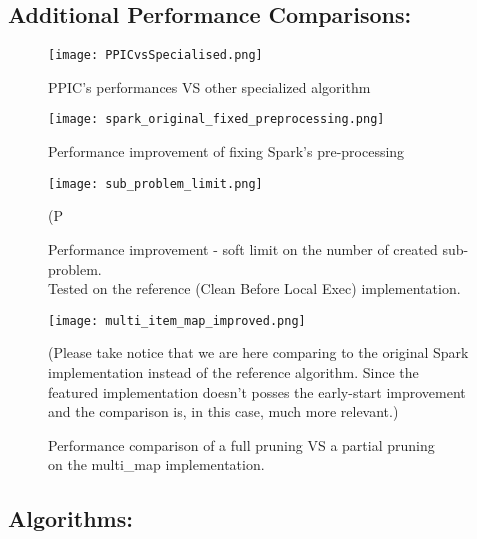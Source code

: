 \documentclass{eplmastersthesis}
\begin{document}
\subsection{Additional Performance Comparisons:}

\begin{figure}[h]
  \centering
  \texttt{[image: PPICvsSpecialised.png]}
  \caption{PPIC's performances VS other specialized algorithm}
  \label{fig:PPICvsOther}
\end{figure}

\begin{figure}[h]
  \centering
  \texttt{[image: spark\_original\_fixed\_preprocessing.png]}
  \caption{Performance improvement of fixing Spark's pre-processing}
  \label{fig:spark_preprocessing_fix}
\end{figure}

\begin{figure}[h]
  \centering
  \texttt{[image: sub\_problem\_limit.png]}
  \caption[Performance improvement - soft limit on the number of created sub-problem.]{
  		Performance improvement - soft limit on the number of created sub-problem. \\ 
  		Tested on the reference (Clean Before Local Exec) implementation.
  	\endtabular
  }
  (P
  \label{fig:sub_problem_limit}
\end{figure}

\begin{figure}[h]
  \centering
  \texttt{[image: multi\_item\_map\_improved.png]}
  \caption[PPIC with a map structure]{
  		Performance comparison of a full pruning VS a partial pruning \\ 
  		on the \textrm{multi\_map} implementation.
  	\endtabular
  }
  (Please take notice that we are here comparing to the original Spark implementation instead of the reference algorithm. Since the featured implementation doesn't posses the early-start improvement and the comparison is, in this case, much more relevant.)
  \label{fig:multi_map_comp}
\end{figure}

\clearpage
\subsection{Algorithms:}
\end{document}
